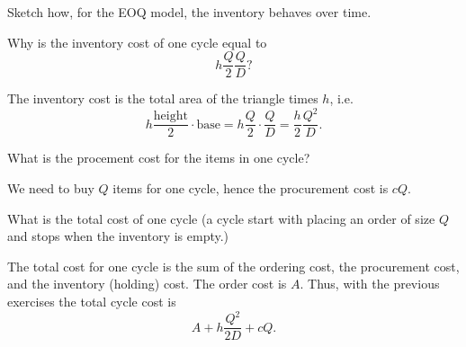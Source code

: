 \begin{exercise}
Sketch how,  for the EOQ model, the inventory behaves over time.
  \begin{solution}
\begin{center}
\end{center}

  \end{solution}
\end{exercise}

\begin{exercise}
  Why is the inventory cost of one cycle equal to 
  \begin{equation*}
    h \frac Q  2\frac  Q D?
  \end{equation*}
  \begin{solution}
 The inventory cost is the total area of the triangle times $h$, i.e. 
\begin{equation*}
  h \frac{\text{height}} 2 \cdot\text{base} = h \frac Q 2 \cdot \frac Q D= \frac h 2 \frac{Q^2}D.
\end{equation*}
  \end{solution}
\end{exercise}

\begin{exercise}
  What is the procement cost for the items in one cycle?
  \begin{solution}
We need to buy $Q$ items for one cycle, hence the procurement cost is $c Q$.
  \end{solution}
\end{exercise}

\begin{exercise}
What is the total cost of one cycle (a cycle start with placing an order of size $Q$ and stops when the inventory is empty.)
  \begin{solution}
The total cost for one cycle is the sum of the ordering cost, the procurement cost, and the inventory (holding) cost. The order cost is $A$. Thus, with the previous exercises
 the total cycle cost is 
\begin{equation*}
A+h\frac{Q^2}{2 D} + c Q.
\end{equation*}
\end{solution}
\end{exercise}

